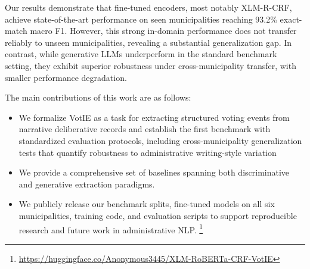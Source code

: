 \documentclass[11pt]{article}
\begin{document}


Our results demonstrate that fine-tuned encoders, most notably XLM-R-CRF, achieve state-of-the-art performance on seen municipalities reaching 93.2\% exact-match macro F1. However, this strong in-domain performance does not transfer reliably to unseen municipalities, revealing a substantial generalization gap. In contrast, while generative LLMs underperform in the standard benchmark setting, they exhibit superior robustness under cross-municipality transfer, with smaller performance degradation. %

The main contributions of this work are as follows:
\begin{itemize}
    \item We formalize VotIE as a task for extracting structured voting events from narrative deliberative records and establish the first benchmark with standardized evaluation protocols, including cross-municipality generalization tests that quantify robustness to administrative writing-style variation
    \item We provide a comprehensive set of baselines spanning both discriminative and generative extraction paradigms.
    \item We publicly release our benchmark splits, fine-tuned models on all six municipalities, training code, and evaluation scripts to support reproducible research and future work in administrative NLP. \footnote{\url{https://huggingface.co/Anonymous3445/XLM-RoBERTa-CRF-VotIE}}
\end{itemize}
\end{document}
